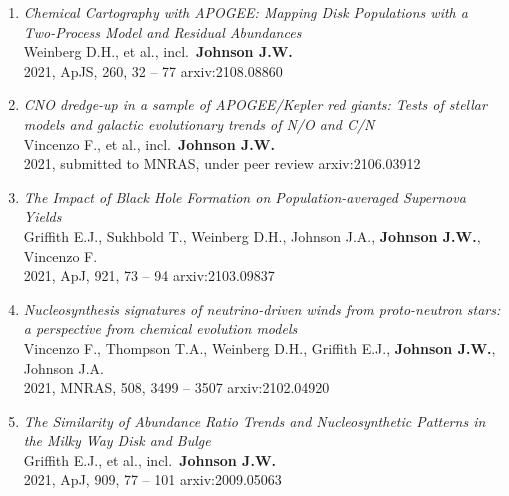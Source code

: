 \documentclass[cv.tex]{subfiles}
\begin{document}
\begin{enumerate}
	\item \textit{Chemical Cartography with APOGEE: Mapping Disk Populations
	with a Two-Process Model and Residual Abundances}
	\\
	Weinberg D.H., et al., incl.~\textbf{Johnson J.W.}
	\\
	2021, ApJS, 260, 32 -- 77 \hfill arxiv:2108.08860

	\item \textit{CNO dredge-up in a sample of APOGEE/Kepler red giants: Tests
	of stellar models and galactic evolutionary trends of N/O and C/N}
	\\
	Vincenzo F., et al., incl.~\textbf{Johnson J.W.}
	\\
	2021, submitted to MNRAS, under peer review \hfill arxiv:2106.03912

	\item \textit{The Impact of Black Hole Formation on Population-averaged
	Supernova Yields}
	\\
	Griffith E.J., Sukhbold T., Weinberg D.H., Johnson J.A.,
	\textbf{Johnson J.W.}, Vincenzo F.
	\\
	2021, ApJ, 921, 73 -- 94 \hfill arxiv:2103.09837

	\item \textit{Nucleosynthesis signatures of neutrino-driven winds from
	proto-neutron stars: a perspective from chemical evolution models}
	\\
	Vincenzo F., Thompson T.A., Weinberg D.H., Griffith E.J.,
	\textbf{Johnson J.W.}, Johnson J.A.
	\\
	2021, MNRAS, 508, 3499 -- 3507 \hfill arxiv:2102.04920

	\item \textit{The Similarity of Abundance Ratio Trends and Nucleosynthetic
	Patterns in the Milky Way Disk and Bulge}
	\\
	Griffith E.J., et al., incl.~\textbf{Johnson J.W.}
	\\
	2021, ApJ, 909, 77 -- 101 \hfill arxiv:2009.05063

\end{enumerate}
\end{document}
